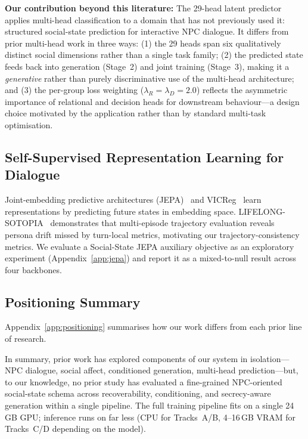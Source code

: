 \documentclass[11pt]{article}
\begin{document}
\textbf{Our contribution beyond this literature:}
The 29-head latent predictor applies multi-head classification to a domain that has not previously used it: structured social-state prediction for interactive NPC dialogue.
It differs from prior multi-head work in three ways: (1) the 29 heads span six qualitatively distinct social dimensions rather than a single task family; (2) the predicted state feeds back into generation (Stage~2) and joint training (Stage~3), making it a \textit{generative} rather than purely discriminative use of the multi-head architecture; and (3) the per-group loss weighting ($\lambda_R = \lambda_D = 2.0$) reflects the asymmetric importance of relational and decision heads for downstream behaviour---a design choice motivated by the application rather than by standard multi-task optimisation.

\subsection{Self-Supervised Representation Learning for Dialogue}

Joint-embedding predictive architectures (JEPA)~\cite{lecun2022path,assran2023self} and VICReg~\cite{bardes2022vicreg} learn representations by predicting future states in embedding space.
LIFELONG-SOTOPIA~\cite{lifelong2025sotopia} demonstrates that multi-episode trajectory evaluation reveals persona drift missed by turn-local metrics, motivating our trajectory-consistency metrics.
We evaluate a Social-State JEPA auxiliary objective as an exploratory experiment (Appendix~\ref{app:jepa}) and report it as a mixed-to-null result across four backbones.

\subsection{Positioning Summary}

Appendix~\ref{app:positioning} summarises how our work differs from each prior line of research.

In summary, prior work has explored components of our system in isolation---NPC dialogue, social affect, conditioned generation, multi-head prediction---but, to our knowledge, no prior study has evaluated a fine-grained NPC-oriented social-state schema across recoverability, conditioning, and secrecy-aware generation within a single pipeline.
The full training pipeline fits on a single 24\,GB GPU;
inference runs on far less (CPU for Tracks~A/B, 4--16\,GB VRAM for Tracks~C/D depending on the model).
\end{document}
